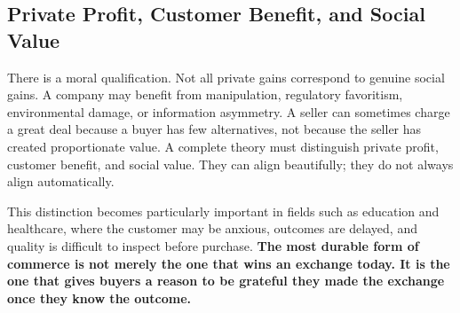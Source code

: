 \subsection{Private Profit, Customer Benefit, and Social Value}

There is a moral qualification. Not all private gains correspond to genuine social gains. A company may benefit from manipulation, regulatory favoritism, environmental damage, or information asymmetry. A seller can sometimes charge a great deal because a buyer has few alternatives, not because the seller has created proportionate value. A complete theory must distinguish private profit, customer benefit, and social value. They can align beautifully; they do not always align automatically.

This distinction becomes particularly important in fields such as education and healthcare, where the customer may be anxious, outcomes are delayed, and quality is difficult to inspect before purchase. \textbf{The most durable form of commerce is not merely the one that wins an exchange today. It is the one that gives buyers a reason to be grateful they made the exchange once they know the outcome.}

